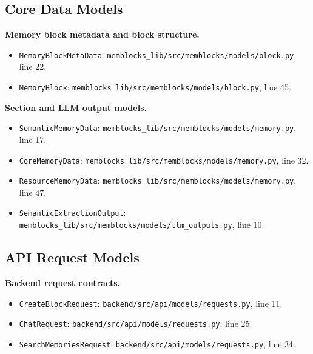 \documentclass[12pt,a4paper]{article}
\begin{document}
\subsection{Core Data Models}

\textbf{Memory block metadata and block structure.}
\begin{itemize}
    \item \texttt{MemoryBlockMetaData}: \texttt{memblocks\_lib/src/memblocks/models/block.py}, line 22.
    \item \texttt{MemoryBlock}: \texttt{memblocks\_lib/src/memblocks/models/block.py}, line 45.
\end{itemize}

\textbf{Section and LLM output models.}
\begin{itemize}
    \item \texttt{SemanticMemoryData}: \texttt{memblocks\_lib/src/memblocks/models/memory.py}, line 17.
    \item \texttt{CoreMemoryData}: \texttt{memblocks\_lib/src/memblocks/models/memory.py}, line 32.
    \item \texttt{ResourceMemoryData}: \texttt{memblocks\_lib/src/memblocks/models/memory.py}, line 47.
    \item \texttt{SemanticExtractionOutput}: \texttt{memblocks\_lib/src/memblocks/models/llm\_outputs.py}, line 10.
\end{itemize}

\subsection{API Request Models}

\textbf{Backend request contracts.}
\begin{itemize}
    \item \texttt{CreateBlockRequest}: \texttt{backend/src/api/models/requests.py}, line 11.
    \item \texttt{ChatRequest}: \texttt{backend/src/api/models/requests.py}, line 25.
    \item \texttt{SearchMemoriesRequest}: \texttt{backend/src/api/models/requests.py}, line 34.
\end{itemize}

\clearpage



\end{document}
